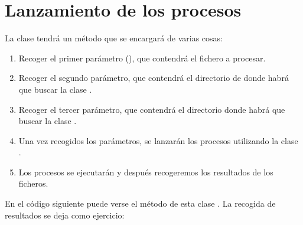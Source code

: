 \documentclass[letterpaper,10pt,spanish]{sphinxmanual}
\begin{document}
\section{Lanzamiento de los procesos}
\label{\detokenize{textos/tema1:lanzamiento-de-los-procesos}}
La clase  tendrá un método  que se encargará de varias cosas:
\begin{enumerate}
%
\item {} 
Recoger el primer parámetro (), que contendrá el fichero a procesar.

\item {} 
Recoger el segundo parámetro, que contendrá el directorio de  donde habrá que buscar la clase .

\item {} 
Recoger el tercer parámetro, que contendrá el directorio donde habrá que buscar la clase .

\item {} 
Una vez recogidos los parámetros, se lanzarán los procesos utilizando la clase .

\item {} 
Los procesos se ejecutarán y después recogeremos los resultados de los ficheros.

\end{enumerate}

En el código siguiente puede verse el método  de esta clase . La recogida de resultados se deja como ejercicio:
\end{document}

